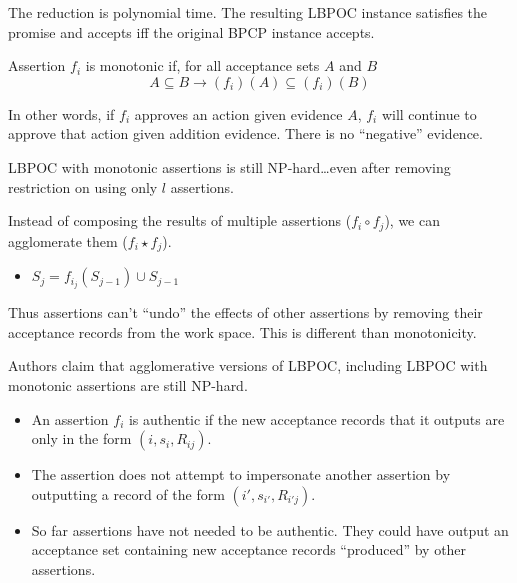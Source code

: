 \documentclass[landscape]{slides}
\begin{document}
The reduction is polynomial time. The resulting LBPOC instance satisfies the promise and accepts iff the original BPCP instance accepts.

\stopslide


Assertion $f_i$ is monotonic if, for all acceptance sets $A$ and $B$
\begin{displaymath}
A \subseteq B \rightarrow (f_i)(A) \subseteq (f_i)(B)
\end{displaymath}

In other words, if $f_i$ approves an action given evidence $A$, $f_i$ will continue to approve that action given addition evidence. There is no ``negative'' evidence.

LBPOC with monotonic assertions is still NP-hard\ldots even after removing restriction on using only $l$ assertions.

\stopslide


Instead of composing the results of multiple assertions ($f_i \circ f_j$), we can agglomerate them ($f_i \star f_j$).

\begin{itemize}
\item $S_j = f_{i_j}(S_{j-1}) \cup S_{j-1}$
\end{itemize}

Thus assertions can't ``undo'' the effects of other assertions by removing their acceptance records from the work space. This is different than monotonicity.

Authors claim that agglomerative versions of LBPOC, including LBPOC with monotonic assertions are still NP-hard.

\stopslide


\begin{itemize}
\item An assertion $f_i$ is authentic if the new acceptance records that it outputs are only in the form $(i, s_i, R_{ij})$.
\item The assertion does not attempt to impersonate another assertion by outputting a record of the form $(i', s_{i'}, R_{i'j})$.
\item So far assertions have not needed to be authentic. They could have output an acceptance set containing new acceptance records ``produced'' by other assertions.
\end{itemize}
\end{document}
